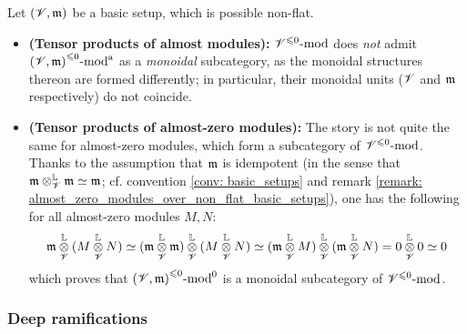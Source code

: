                 \begin{remark} \label{remark: incompatible_monoidal_structures_almost_modules}
                    Let $(\mathscr{V}, \mathfrak{m})$ be a basic setup, which is possible non-flat.
                    \begin{itemize}
                        \item \textbf{(Tensor products of almost modules):} ${\mathscr{V}}^{\leqslant 0}\text{-}\mathrm{mod}$ does \textit{not} admit ${(\mathscr{V}, \mathfrak{m})}^{\leqslant 0}\text{-}\mathrm{mod}^{\mathrm{a}}$ as a \textit{monoidal} subcategory, as the monoidal structures thereon are formed differently; in particular, their monoidal units ($\mathscr{V}$ and $\mathfrak{m}$ respectively) do not coincide.
                        \item \textbf{(Tensor products of almost-zero modules):} The story is not quite the same for almost-zero modules, which form a subcategory of ${\mathscr{V}}^{\leqslant 0}\text{-}\mathrm{mod}$. Thanks to the assumption that $\mathfrak{m}$ is idempotent (in the sense that $\m \tensor_{\scrV}^{\L} \m \cong \m$; cf. convention \ref{conv: basic_setups} and remark \ref{remark: almost_zero_modules_over_non_flat_basic_setups}), one has the following for all almost-zero modules $M, N$:
                            $$\m \tensor_{\scrV}^{\L} (M \tensor_{\scrV}^{\L} N) \cong (\m \tensor_{\scrV}^{\L} \m) \tensor_{\scrV}^{\L} (M \tensor_{\scrV}^{\L} N) \cong (\m \tensor_{\scrV}^{\L} M) \tensor_{\scrV}^{\L} (\m \tensor_{\scrV}^{\L} N) = 0 \tensor_{\scrV}^{\L} 0 \cong 0$$
                        which proves that ${(\mathscr{V}, \mathfrak{m})}^{\leqslant 0}\text{-}\mathrm{mod}^0$ is a monoidal subcategory of ${\mathscr{V}}^{\leqslant 0}\text{-}\mathrm{mod}$. 
                    \end{itemize}
                \end{remark}
                
                \begin{definition} \label{def: almost_flatness}
                
                \end{definition}
            
            \subsubsection{Deep ramifications}